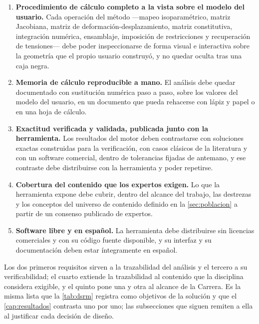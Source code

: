\begin{enumerate}
    \item \textbf{Procedimiento de cálculo completo a la vista sobre el modelo del usuario.} Cada operación del método —mapeo isoparamétrico, matriz Jacobiana, matriz de deformación-desplazamiento, matriz constitutiva, integración numérica, ensamblaje, imposición de restricciones y recuperación de tensiones— debe poder inspeccionarse de forma visual e interactiva sobre la geometría que el propio usuario construyó, y no quedar oculta tras una caja negra.
    \item \textbf{Memoria de cálculo reproducible a mano.} El análisis debe quedar documentado con sustitución numérica paso a paso, sobre los valores del modelo del usuario, en un documento que pueda rehacerse con lápiz y papel o en una hoja de cálculo.
    \item \textbf{Exactitud verificada y validada, publicada junto con la herramienta.} Los resultados del motor deben contrastarse con soluciones exactas construidas para la verificación, con casos clásicos de la literatura y con un software comercial, dentro de tolerancias fijadas de antemano, y ese contraste debe distribuirse con la herramienta y poder repetirse.
    \item \textbf{Cobertura del contenido que los expertos exigen.} Lo que la herramienta expone debe cubrir, dentro del alcance del trabajo, las destrezas y los conceptos del universo de contenido definido en la \autoref{sec:poblacion} a partir de un consenso publicado de expertos.
    \item \textbf{Software libre y en español.} La herramienta debe distribuirse sin licencias comerciales y con su código fuente disponible, y su interfaz y su documentación deben estar íntegramente en español.
\end{enumerate}

Los dos primeros requisitos sirven a la trazabilidad del análisis y el tercero a su verificabilidad; el cuarto extiende la trazabilidad al contenido que la disciplina considera exigible, y el quinto pone una y otra al alcance de la Carrera. Es la misma lista que la \autoref{tab:dsrm} registra como objetivos de la solución y que el \autoref{cap:resultados} contrasta uno por uno; las subsecciones que siguen remiten a ella al justificar cada decisión de diseño.

